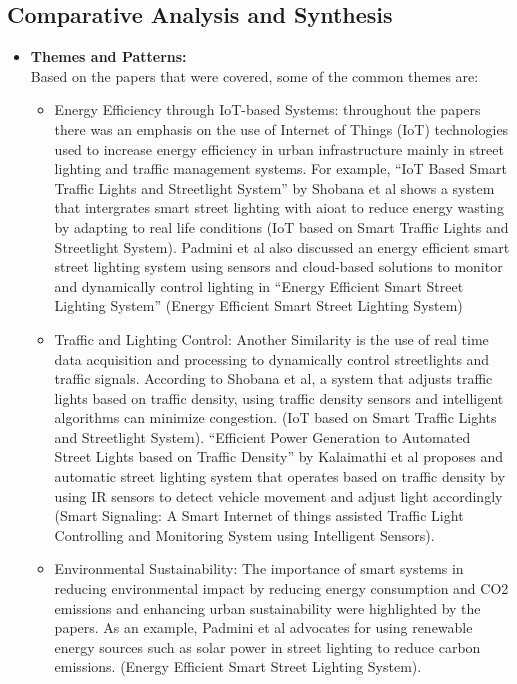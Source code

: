 \documentclass[12pt,a4paper]{article}
\begin{document}
\subsection{Comparative Analysis and Synthesis}

\begin{itemize}
    \item \textbf{Themes and Patterns:}\\
    
    Based on the papers that were covered, some of the common themes are:
    
    \begin{itemize}
        \item Energy Efficiency through IoT-based Systems: throughout the papers there was an emphasis on the use of Internet of Things (IoT) technologies used to increase energy efficiency in urban infrastructure mainly in street lighting and traffic management systems. For example, “IoT Based Smart Traffic Lights and Streetlight System” by Shobana et al shows a system that intergrates smart street lighting with aioat to reduce energy wasting by adapting to real life conditions (IoT based on Smart Traffic Lights and Streetlight System). Padmini et al also discussed an energy efficient smart street lighting system using sensors and cloud-based solutions to monitor and dynamically control lighting in “Energy Efficient Smart Street Lighting System” (Energy Efficient Smart Street Lighting System)
        \item Traffic and Lighting Control: Another Similarity is the use of real time data acquisition and processing to dynamically control streetlights and traffic signals. According to Shobana et al, a system that adjusts traffic lights based on traffic density, using traffic density sensors and intelligent algorithms can minimize congestion. (IoT based on Smart Traffic Lights and Streetlight System). “Efficient Power Generation to Automated Street Lights based on Traffic Density” by Kalaimathi et al proposes and automatic street lighting system that operates based on traffic density by using IR sensors to detect vehicle movement and adjust light accordingly (Smart Signaling: A Smart Internet of things assisted Traffic Light Controlling and Monitoring System using Intelligent Sensors).
        \item Environmental Sustainability: The importance of smart systems in reducing environmental impact by reducing energy consumption and CO2 emissions and enhancing urban sustainability were highlighted by the papers. As an example, Padmini et al advocates for using renewable energy sources such as solar power in street lighting to reduce carbon emissions. (Energy Efficient Smart Street Lighting System). 
    \end{itemize}


\end{itemize}
\end{document}
